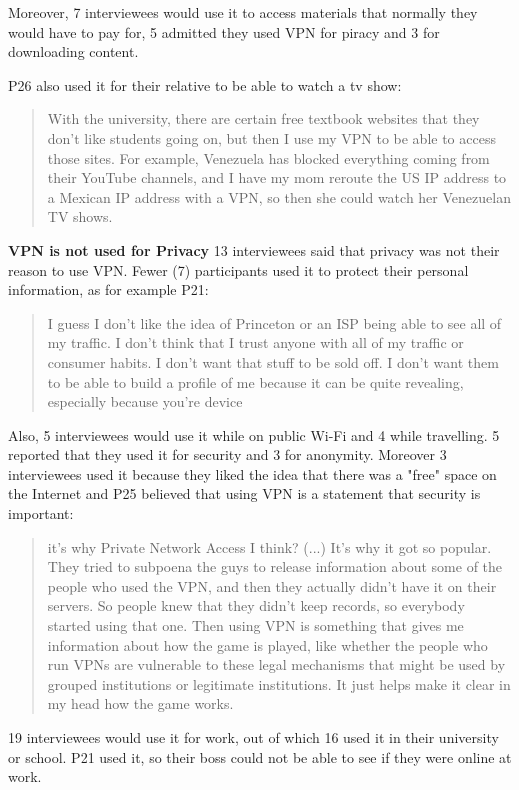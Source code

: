 Moreover, 7 interviewees would use it to access materials that normally they
would have to pay for, 5 admitted they used VPN for piracy and 3 for
downloading content.

P26 also used it for their relative to be able to watch a tv show:
\begin{quote}With the university, there
    are certain free textbook websites that they don't like students going on,
    but then I use my VPN to be able to access those sites. For example,
    Venezuela has blocked everything coming from their YouTube channels, and I
    have my mom reroute the US IP address to a Mexican IP address with a VPN,
    so then she could watch her Venezuelan TV shows.\end{quote}

\textbf{VPN is not used for Privacy} 13 interviewees said that privacy was not
their reason to use VPN. Fewer (7) participants used it to protect their
personal information, as for example P21: \begin{quote}I guess I don't like
the idea of Princeton or an ISP being able to see all of my traffic. I don't
think that I trust anyone with all of my traffic or consumer habits. I don't
want that stuff to be sold off. I don't want them to be able to build a
profile of me because it can be quite revealing, especially because you're
device\end{quote}


Also, 5 interviewees would use it while on public Wi-Fi and 4 while
travelling. 5 reported that they used it for security and 3 for anonymity.
Moreover 3 interviewees used it because they liked the idea that there was a
"free" space on the Internet and P25 believed that using VPN is a statement
that security is important:

\begin{quote}it's why Private Network Access I think? (...) It's why it got so
popular. They tried to subpoena the guys to release information about some of
the people who used the VPN, and then they actually didn't have it on their
servers. So people knew that they didn't keep records, so everybody started
using that one. Then using VPN is something that gives me information about
how the game is played, like whether the people who run VPNs are vulnerable to
these legal mechanisms that might be used by grouped institutions or
legitimate institutions. It just helps make it clear in my head how the game
works.\end{quote}


19 interviewees would use it for work, out of which 16 used it in their
university or school. P21 used it, so their boss could not be able to see if
they were online at work.



